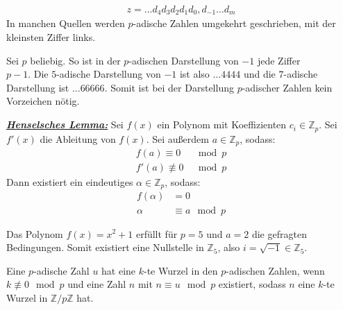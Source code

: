 \documentclass[9pt]{article}
\newcommand{\tbf}[1]{\textbf{#1}}
\newcommand{\ul}[1]{\underline{#1}}
\newcommand{\theoremname}[1]{\emph{\tbf{\ul{#1}}}}
\newcommand{\bZ}{\mathbb{Z}}
\begin{document}
	\begin{align*}
		z = \hdots d_4 d_3 d_2 d_1 d_0, d_{-1} \hdots d_{m}
	\end{align*}
	In manchen Quellen werden $p$-adische Zahlen umgekehrt geschrieben, mit der kleinsten Ziffer links.
	\begin{proposition}
		Sei $p$ beliebig. So ist in der $p$-adischen Darstellung von $-1$ jede Ziffer\\ $p-1$. Die $5$-adische Darstellung von $-1$ ist also $\hdots4444$ und die $7$-adische Darstellung ist $\hdots66666$. Somit ist bei der Darstellung $p$-adischer Zahlen kein Vorzeichen nötig.
	\end{proposition}
	\setcounter{hahaone}{3}
	\begin{theorem}
		\theoremname{Henselsches Lemma:}
		Sei $f(x)$ ein Polynom mit Koeffizienten $c_i \in \bZ_p$. Sei $f'(x)$ die Ableitung von $f(x)$.
		Sei außerdem $a \in \bZ_p$, sodass:
		\begin{align*}
			f(a) \equiv 0 &\mod p\\
			f'(a) \not\equiv 0 &\mod p
		\end{align*}
		Dann existiert ein eindeutiges $\alpha \in \bZ_p$, sodass:
		\begin{align*}
				f(\alpha) &= 0\\
				\alpha &\equiv a \mod p
		\end{align*}
	\end{theorem}
	\begin{application}
		Das Polynom $f(x) = x^2 + 1$ erfüllt für $p = 5$ und $a = 2$ die gefragten Bedingungen. Somit existiert eine Nullstelle in $\bZ_5$, also $i = \sqrt{-1} \in \bZ_5$.
	\end{application}
	\begin{application}
		Eine $p$-adische Zahl $u$ hat eine $k$-te Wurzel in den $p$-adischen Zahlen, wenn $k \not \equiv 0 \mod p$ und eine Zahl $n$ mit $n \equiv u \mod p$ existiert, sodass $n$ eine $k$-te Wurzel in $\bZ / p\bZ$ hat.
	\end{application}
\end{document}
